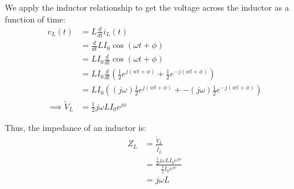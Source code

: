 \begin{enumerate}
{    We apply the inductor relationship to get the voltage across the inductor as a function of time:
    \begin{align*}
        v_L(t) &= L \frac{d}{dt} i_L(t) \\
        &= \frac{d}{dt} L I_0 \cos(\omega t + \phi) \\
        &= LI_0 \frac{d}{dt} \cos(\omega t + \phi) \\
        &= LI_0 \frac{d}{dt} \left(\frac{1}{2}e^{j(wt+\phi)} + \frac{1}{2}e^{-j(wt+\phi)}\right)\\
        &= LI_0 \left((j\omega)\frac{1}{2}e^{j(wt+\phi)} + -(j\omega)\frac{1}{2}e^{-j(wt+\phi)}\right)\\
        \implies \widetilde{V}_L &= \frac{1}{2} j \omega L I_0 e^{j \phi}
    \end{align*}

    Thus, the impedance of an inductor is:
    \begin{align*}
        Z_L &= \frac{\widetilde{V}_L}{\widetilde{I}_L} \\
        &= \frac{\frac{1}{2} j \omega L I_0 e^{j \phi}}{\frac{1}{2} I_0 e^{j \phi}} \\
        &= j\omega L
    \end{align*}
}

\end{enumerate}







